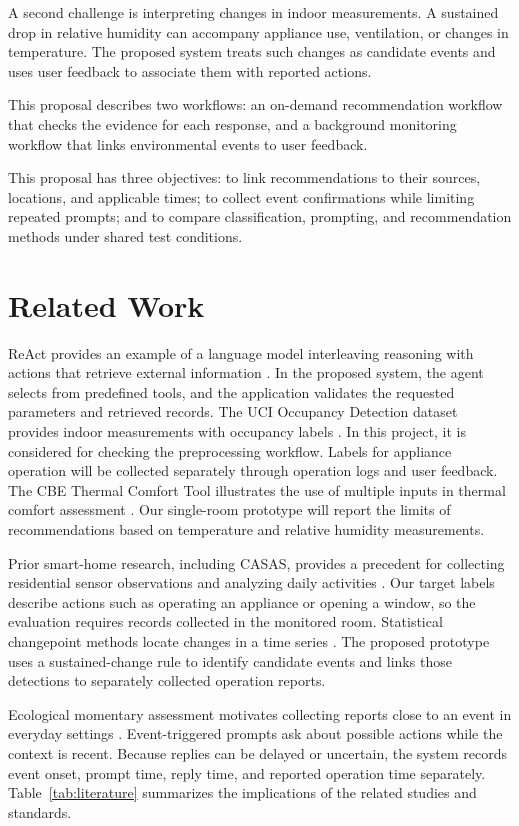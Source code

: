 \documentclass[conference]{IEEEtran}
\begin{document}
A second challenge is interpreting changes in indoor measurements. A sustained drop in relative humidity can accompany appliance use, ventilation, or changes in temperature. The proposed system treats such changes as candidate events and uses user feedback to associate them with reported actions.

This proposal describes two workflows: an on-demand recommendation workflow that checks the evidence for each response, and a background monitoring workflow that links environmental events to user feedback.

This proposal has three objectives: to link recommendations to their sources, locations, and applicable times; to collect event confirmations while limiting repeated prompts; and to compare classification, prompting, and recommendation methods under shared test conditions.

\section{Related Work}
ReAct provides an example of a language model interleaving reasoning with actions that retrieve external information \cite{yao2023react}. In the proposed system, the agent selects from predefined tools, and the application validates the requested parameters and retrieved records. The UCI Occupancy Detection dataset provides indoor measurements with occupancy labels \cite{uci_occupancy}. In this project, it is considered for checking the preprocessing workflow. Labels for appliance operation will be collected separately through operation logs and user feedback. The CBE Thermal Comfort Tool illustrates the use of multiple inputs in thermal comfort assessment \cite{tartarini2020cbe}. Our single-room prototype will report the limits of recommendations based on temperature and relative humidity measurements.


Prior smart-home research, including CASAS, provides a precedent for collecting residential sensor observations and analyzing daily activities \cite{cook2013casas}. Our target labels describe actions such as operating an appliance or opening a window, so the evaluation requires records collected in the monitored room. Statistical changepoint methods locate changes in a time series \cite{killick2012changepoints}. The proposed prototype uses a sustained-change rule to identify candidate events and links those detections to separately collected operation reports.

Ecological momentary assessment motivates collecting reports close to an event in everyday settings \cite{shiffman2008ema}. Event-triggered prompts ask about possible actions while the context is recent. Because replies can be delayed or uncertain, the system records event onset, prompt time, reply time, and reported operation time separately. Table~\ref{tab:literature} summarizes the implications of the related studies and standards.
\end{document}
